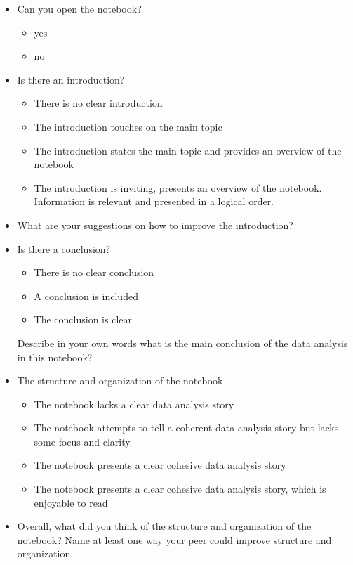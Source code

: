 \documentclass[a4paper,11pt]{article}
\begin{document}
\begin{itemize}
\item Can you open the notebook?
\begin{itemize}
\item yes
\item no
\end{itemize}

\item Is there an introduction? 
  \begin{itemize}
  \item There is no clear introduction
  \item The introduction touches on the main topic
  \item The introduction states the main topic and provides an overview of the notebook
  \item The introduction is inviting, presents an overview of the
    notebook. Information is relevant and presented in a logical
    order.
\end{itemize}

\item What are your suggestions on how to improve the introduction?

\item Is there a conclusion? 
  \begin{itemize}
  \item There is no clear conclusion
  \item A conclusion is included
  \item The conclusion is clear
  \end{itemize}
  
Describe in your own words what is the main conclusion of the data analysis in this notebook?

\item The structure and organization of the notebook
  \begin{itemize}
  \item The notebook lacks a clear data analysis story
  \item The notebook attempts to tell a coherent data analysis story but lacks some focus and clarity.
  \item The notebook presents a clear cohesive data analysis story
  \item The notebook presents a clear cohesive data analysis
    story, which is enjoyable to read
  \end{itemize}
  
\item Overall, what did you think of the structure and organization of the
notebook? Name at least one way your peer could improve structure and
organization.


\end{itemize}
\end{document}
